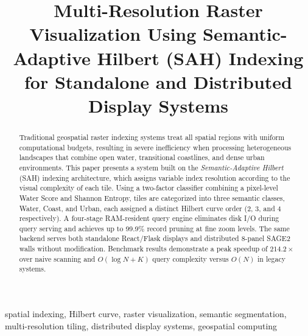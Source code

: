 \documentclass[conference]{IEEEtran}
\begin{document}
\title{Multi-Resolution Raster Visualization Using Semantic-Adaptive Hilbert (SAH) Indexing for Standalone and Distributed Display Systems}

\author{
  \and
}
\maketitle

\begin{abstract}
Traditional geospatial raster indexing systems treat all spatial regions with uniform computational budgets, resulting in severe inefficiency when processing heterogeneous landscapes that combine open water, transitional coastlines, and dense urban environments. This paper presents a system built on the \textit{Semantic-Adaptive Hilbert} (SAH) indexing architecture, which assigns variable index resolution according to the visual complexity of each tile. Using a two-factor classifier combining a pixel-level Water Score and Shannon Entropy, tiles are categorized into three semantic classes, Water, Coast, and Urban, each assigned a distinct Hilbert curve order (2, 3, and 4 respectively). A four-stage RAM-resident query engine eliminates disk I/O during query serving and achieves up to 99.9\% record pruning at fine zoom levels. The same backend serves both standalone React/Flask displays and distributed 8-panel SAGE2 walls without modification. Benchmark results demonstrate a peak speedup of $214.2\times$ over naive scanning and $O(\log N + K)$ query complexity versus $O(N)$ in legacy systems.
\end{abstract}

\begin{IEEEkeywords}
  spatial indexing, Hilbert curve, raster visualization, semantic segmentation, multi-resolution tiling, distributed display systems, geospatial computing
\end{IEEEkeywords}

\end{document}
